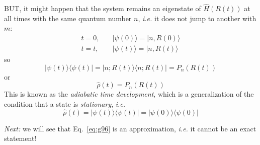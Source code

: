 \documentclass[12pt]{article}
\newcommand{\be}{\begin{equation}}
\newcommand{\ee}{\end{equation}}
\begin{document}
BUT, it might happen that the system
remains an eigenstate of $\hat{H}(R(t))$ at all
times with the same quantum number $n$,
\textit{i.e.} it does not jump to another with $m$:
\be
\begin{aligned}
t=0, \quad&|\psi(0)\rangle=|n, R(0)\rangle\\
t=t, \quad&|\psi(t)\rangle=|n, R(t)\rangle
\end{aligned}
\ee
so
\be
|\psi(t)\rangle\langle\psi(t)|=| n ; R(t)\rangle\langle n ; R(t)|=P_{n}(R(t))
\label{eq:g96}
\ee
or
\be
\hat{\rho}(t)=P_{n}(R(t))
\ee
This is known as the \emph{adiabatic time development},
which is a generalization of the condition that
a state is \emph{stationary}, \textit{i.e.}
\be
\hat{\rho}(t)=|\psi(t)\rangle\langle\psi(t)|=| \psi(0)\rangle\langle\psi(0)|
\ee

\emph{Next:} we will see that 
Eq.~\eqref{eq:g96} is an
approximation, \textit{i.e.} it cannot be an exact
statement!
\end{document}

